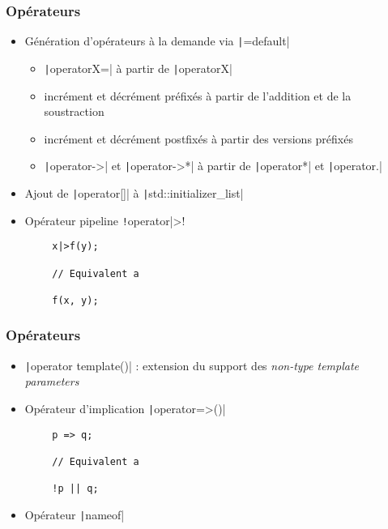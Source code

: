 \documentclass[C++.tex]{subfiles}
\begin{document}
\begin{frame}[fragile]
	\frametitle{Opérateurs}
	\begin{itemize}
		\item Génération d'opérateurs à la demande via \texttt|=default|
		\begin{itemize}
			\item \texttt|operatorX=| à partir de \texttt|operatorX|
			\item incrément et décrément préfixés à partir de l'addition et de la soustraction
			\item incrément et décrément postfixés à partir des versions préfixés
			\item \texttt|operator->| et \texttt|operator->*| à partir de \texttt|operator*| et \texttt|operator.|


		\end{itemize}
		\item Ajout de \texttt|operator[]| à \texttt|std::initializer_list|
		\item Opérateur pipeline \texttt!operator|>!
	\end{itemize}

	\begin{verbatim}
		x|>f(y);

		// Equivalent a

		f(x, y);
	\end{verbatim}

\end{frame}

\begin{frame}[fragile]
	\frametitle{Opérateurs}
	\begin{itemize}
		\item \texttt|operator template()| : extension du support des \textit{non-type template parameters}
		\item Opérateur d'implication \texttt|operator=>()|
	\end{itemize}

	\begin{verbatim}
		p => q;

		// Equivalent a

		!p || q;
	\end{verbatim}

	\begin{itemize}
		\item Opérateur \texttt|nameof|
	\end{itemize}

\end{frame}
\end{document}
